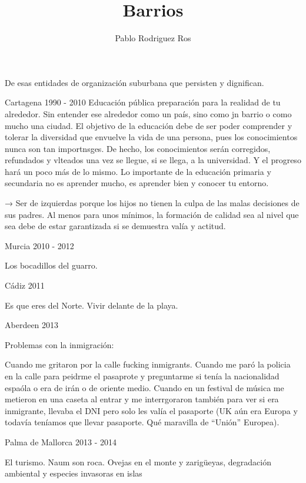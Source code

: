 \documentclass[ebook,11pt,oneside,openany]{memoir}
\begin{document}
\title{Barrios}
\author{Pablo Rodriguez Ros}
\date{}
\maketitle

\section*{}
De esas entidades de organización suburbana que persisten y dignifican.

Cartagena 1990 - 2010
Educación pública preparación para la realidad de tu alrededor. Sin entender ese alrededor como un país, sino como jn barrio o como mucho una ciudad. El objetivo de la educación debe de ser poder comprender y tolerar la diversidad que envuelve la vida de una persona, pues los conocimientos nunca son tan importnsges. De hecho, los conocimientos serán corregidos, refundados y vlteados una vez se llegue, si se llega, a la universidad. Y el progreso hará un poco más de lo mismo. Lo importante de la educación primaria y secundaria no es aprender mucho, es aprender bien y conocer tu entorno.

→ Ser de izquierdas porque los hijos no tienen la culpa de las malas decisiones de sus padres. Al menos para unos mínimos, la formación de calidad sea al nivel que sea debe de estar garantizada si se demuestra valía y actitud.

Murcia 2010 - 2012

Los bocadillos del guarro.

Cádiz 2011

Es que eres del Norte. Vivir delante de la playa.

Aberdeen 2013

Problemas con la inmigración:

Cuando me gritaron por la calle fucking inmigrants. Cuando me paró la policia en la calle para peidrme el pasaprote y preguntarme si tenía la nacionalidad espaóla o era de irán o de oriente medio. Cuando en un festival de música me metieron en una caseta al entrar y me interrgoraron también para ver si era inmigrante, llevaba el DNI pero solo les valía el pasaporte (UK aún era Europa y todavía teníamos que llevar pasaporte. Qué maravilla de “Unión” Europea).

Palma de Mallorca 2013 - 2014

El turismo. Naum son roca. Ovejas en el monte y zarigüeyas, degradación ambiental y especies invasoras en islas 
\end{document}
